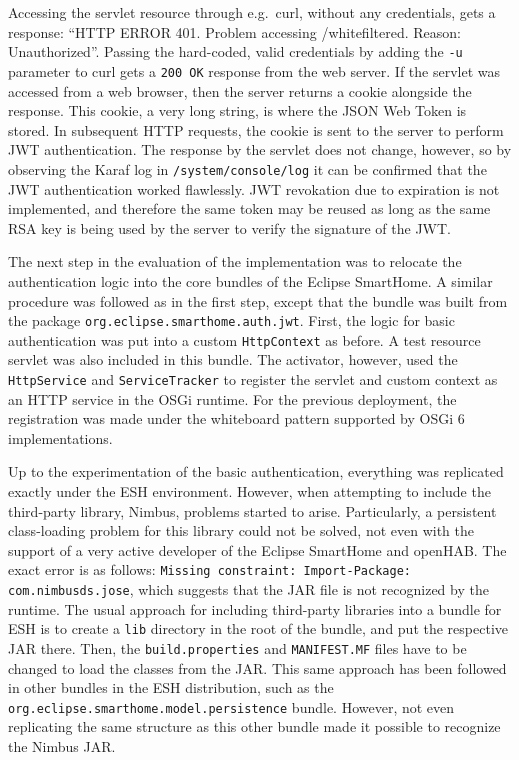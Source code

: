 \documentclass[12pt]{article}
\begin{document}
Accessing the servlet resource through e.g.\ curl, without any credentials, gets a response: ``HTTP ERROR 401. Problem accessing /whitefiltered. Reason: Unauthorized''. Passing the hard-coded, valid credentials by adding the \texttt{-u} parameter to curl gets a \texttt{200 OK} response from the web server. If the servlet was accessed from a web browser, then the server returns a cookie alongside the response. This cookie, a very long string, is where the JSON Web Token is stored. In subsequent HTTP requests, the cookie is sent to the server to perform JWT authentication. The response by the servlet does not change, however, so by observing the Karaf log in \texttt{/system/console/log} it can be confirmed that the JWT authentication worked flawlessly. JWT revokation due to expiration is not implemented, and therefore the same token may be reused as long as the same RSA key is being used by the server to verify the signature of the JWT.

The next step in the evaluation of the implementation was to relocate the authentication logic into the core bundles of the Eclipse SmartHome. A similar procedure was followed as in the first step, except that the bundle was built from the package \texttt{org.eclipse.smarthome.auth.jwt}. First, the logic for basic authentication was put into a custom \texttt{HttpContext} as before. A test resource servlet was also included in this bundle. The activator, however, used the \texttt{HttpService} and \texttt{ServiceTracker} to register the servlet and custom context as an HTTP service in the OSGi runtime. For the previous deployment, the registration was made under the whiteboard pattern supported by OSGi 6 implementations.

Up to the experimentation of the basic authentication, everything was replicated exactly under the ESH environment. However, when attempting to include the third-party library, Nimbus, problems started to arise. Particularly, a persistent class-loading problem for this library could not be solved, not even with the support of a very active developer of the Eclipse SmartHome and openHAB. The exact error is as follows: \texttt{Missing constraint: Import-Package: com.nimbusds.jose}, which suggests that the JAR file is not recognized by the runtime. The usual approach for including third-party libraries into a bundle for ESH is to create a \texttt{lib} directory in the root of the bundle, and put the respective JAR there. Then, the \texttt{build.properties} and \texttt{MANIFEST.MF} files have to be changed to load the classes from the JAR. This same approach has been followed in other bundles in the ESH distribution, such as the \texttt{org.eclipse.smarthome.model.persistence} bundle. However, not even replicating the same structure as this other bundle made it possible to recognize the Nimbus JAR.
\end{document}
